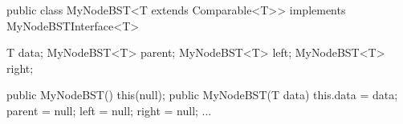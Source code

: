 public class MyNodeBST<T extends Comparable<T>> 
		implements MyNodeBSTInterface<T> {
	T data;
	MyNodeBST<T> parent;
	MyNodeBST<T> left;
	MyNodeBST<T> right;

	public MyNodeBST() {
		this(null);
	}
	public MyNodeBST(T data) {
		this.data = data;
		parent = null;
		left = null;
		right = null;
	}
	...
}